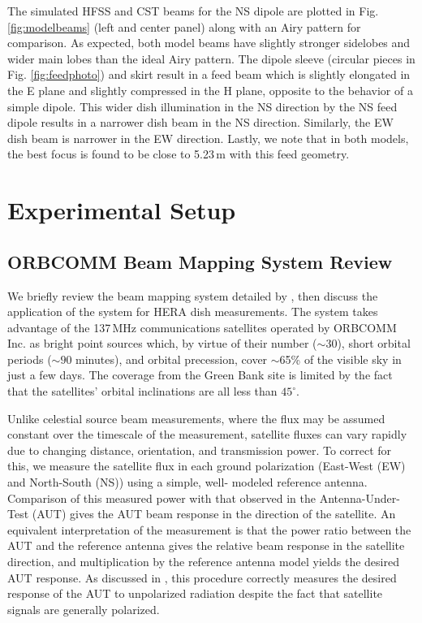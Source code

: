 \documentclass{emulateapj}
\begin{document}
The simulated HFSS and CST beams for the NS dipole are plotted in Fig. \ref{fig:modelbeams} (left and center panel) along with an Airy pattern for comparison. As expected, both model beams have slightly stronger sidelobes and wider main lobes than the ideal Airy pattern. The dipole sleeve (circular pieces in Fig. \ref{fig:feedphoto}) and skirt result in a feed beam which is slightly elongated in the E plane and slightly compressed in the H plane, opposite to the behavior of a simple dipole. This wider dish illumination in the NS direction by the NS feed dipole results in a narrower dish beam in the NS direction. Similarly, the EW dish beam is narrower in the EW direction. Lastly, we note that in both models, the best focus is found to be close to 5.23\,m with this feed geometry.

\section{Experimental Setup}

\subsection{ORBCOMM Beam Mapping System Review}
\label{sec:orbcommreview}

We briefly review the beam mapping system detailed by \citet{neben15}, then discuss the 
application of the system for HERA dish measurements. The system 
takes advantage of the 137\,MHz communications satellites operated by ORBCOMM Inc. 
as bright point sources which, by virtue of their number ($\sim30$), short orbital periods 
($\sim90$ minutes), and orbital precession, cover $\sim$65\% of the visible sky in just a few 
days. The coverage from the Green Bank site is limited by the fact that the satellites' orbital inclinations are all less 
than $45^\circ$. 

Unlike celestial source beam measurements, where the flux may be 
assumed constant over the timescale of the measurement, satellite fluxes can vary rapidly 
due to changing distance, orientation, and transmission power. To correct for this, we 
measure the satellite flux in each ground polarization (East-West (EW) and North-South (NS)) using a simple, well-
modeled reference antenna. Comparison of this measured power with that observed in the 
Antenna-Under-Test (AUT) gives the AUT beam response in the direction of the satellite. 
An equivalent interpretation of the measurement is that the power ratio between the AUT and the reference 
antenna gives the relative beam response in the satellite direction, and multiplication by 
the reference antenna model yields the desired AUT response. As discussed in 
\citet{neben15}, this procedure correctly measures the desired response of the AUT to unpolarized radiation despite the fact that satellite signals are generally polarized.
\end{document}
